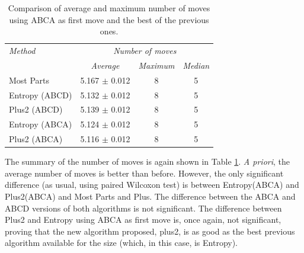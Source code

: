 \documentclass[preprint,12pt]{elsarticle}
\begin{document}
\begin{table}[htb]
\caption{Comparison of average and maximum number of moves using ABCA as first move and the best of the previous ones. \label{tab:abca:48}}
  \centering
\smallskip
\begin{tabular}{|l|c|c|c|}
\hline
\emph{Method} & \multicolumn{3}{c|}{\emph{Number of moves}}\\
 & \emph{Average} & \emph{Maximum} & \emph{Median} \\
\hline
Most Parts & 5.167 $\pm$ 0.012 & 8 & 5 \\
Entropy (ABCD) & 5.132 $\pm$ 0.012 & 8  & 5\\
Plus2 (ABCD) & 5.139  $\pm$ 0.012 & 8 & 5\\
Entropy (ABCA) & 5.124 $\pm$ 0.012 & 8  & 5\\
Plus2 (ABCA) & 5.116  $\pm$ 0.012 & 8 & 5\\
\hline
\end{tabular}
\end{table}
%
The summary of the number of moves is again shown in Table
\ref{tab:abca:48}. {\em A priori}, the average number of moves is
better than before. However, the only significant difference (as
usual, using paired Wilcoxon test) is
between Entropy(ABCA) and Plus2(ABCA) and Most Parts and Plus. The
difference between the ABCA and ABCD versions of both algorithms is not
significant. The difference between Plus2 and Entropy using ABCA as
first move is, once again, not significant, proving that the new
algorithm proposed, plus2, is as good as the best previous algorithm
available for the size (which, in this case, is Entropy). 
\end{document}
